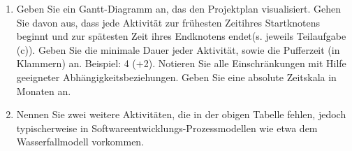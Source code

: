 \documentclass{lehramt-informatik-aufgabe}
\begin{document}
\begin{enumerate}

\item Geben Sie ein Gantt-Diagramm an, das den Projektplan visualisiert.
Gehen Sie davon aus, dass jede Aktivität zur frühesten Zeitihres
Startknotens beginnt und zur spätesten Zeit ihres Endknotens endet(s.
jeweils Teilaufgabe (c)). Geben Sie die minimale Dauer jeder Aktivität,
sowie die Pufferzeit (in Klammern) an. Beispiel: 4 (+2). Notieren Sie
alle Einschränkungen mit Hilfe geeigneter Abhängigkeitsbeziehungen.
Geben Sie eine absolute Zeitskala in Monaten an.


\item Nennen Sie zwei weitere Aktivitäten, die in der obigen Tabelle
fehlen, jedoch typischerweise in Softwareentwicklungs-Prozessmodellen
wie etwa dem Wasserfallmodell vorkommen.
\end{enumerate}
\end{document}
